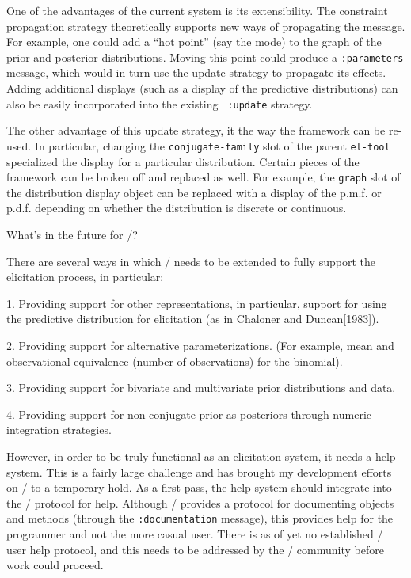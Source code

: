 One of the advantages of the current system is its extensibility.
The constraint propagation strategy theoretically supports new ways of
propagating the message.  For example, one could add a ``hot point''
(say the mode) to the graph of the prior and posterior distributions.
Moving this point could produce a {\tt :parameters\/} message, which
would in turn use the \:update  strategy to propagate its effects.
Adding additional displays (such as a display of the predictive
distributions) can also be easily incorporated into the existing {\tt
:update\/} strategy.

\smallskip

The other advantage of this update strategy, it the way the framework
can be re-used.  In particular, changing the {\tt conjugate-family\/}
slot of the parent {\tt el-tool\/} specialized the display for a
particular distribution.  Certain pieces of the framework can be
broken off and replaced as well.  For example, the {\tt graph\/} slot
of the distribution display object can be replaced with a display of
the p.m.f. or p.d.f. depending on whether the distribution is discrete
or continuous.


  What's in the future for \eltoy/?

There are several ways in which \eltoy/ needs to be extended to
fully support the elicitation process, in particular:

\item{1.} Providing support for other representations, in particular,
support for using the predictive distribution for elicitation (as in
Chaloner and Duncan[1983]).

\item{2.} Providing support for alternative parameterizations.  (For
example, mean and observational equivalence (number of observations)
for the binomial).

\item{3.} Providing support for bivariate and multivariate prior
distributions and data.  

\item{4.} Providing support for non-conjugate prior as posteriors
through numeric integration strategies.

However, in order to be truly functional as an elicitation system, it
needs a help system.  This is a fairly large challenge and has brought
my development efforts on \eltoy/ to a temporary hold.  As a first
pass, the help system should integrate into the \lispstat/ protocol for
help.  Although \lispstat/ provides a protocol for documenting objects
and methods (through the {\tt :documentation\/} message), this
provides help for the programmer and not the more casual user.  There
is as of yet no established \lispstat/ user help protocol, and this
needs to be addressed by the \lispstat/ community before work could
proceed. 

